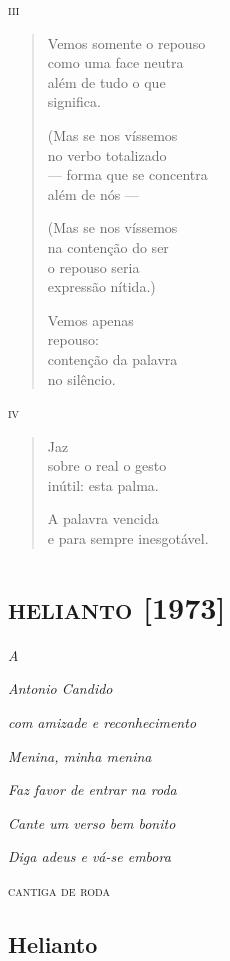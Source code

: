 \pagebreak
\textsc{iii}

\begin{verse}
Vemos somente o repouso\\
como uma face neutra\\
além de tudo o que\\
significa.

(Mas se nos víssemos\\
no verbo totalizado\\
--- forma que se concentra\\
além de nós ---

(Mas se nos víssemos\\
na contenção do ser\\
o repouso seria\\
expressão nítida.)

Vemos apenas\\
repouso:\\
contenção da palavra\\
no silêncio.
\end{verse}

\medskip
\textsc{iv}

\begin{verse}
Jaz\\
sobre o real o gesto\\
inútil: esta palma.

A palavra vencida\\
e para sempre inesgotável.
\end{verse}

\part{\textsc{helianto} {[}1973{]}}

\mbox{}
\vfill
\thispagestyle{empty}

\hfill\emph{A}

\hfill\emph{Antonio Candido}

\hfill\emph{com amizade e reconhecimento}

\pagebreak
\mbox{}\vfill
\thispagestyle{empty}

\hfill\emph{Menina, minha menina}

\hfill\emph{Faz favor de entrar na roda} 

\hfill\emph{Cante um verso bem bonito}

\hfill\emph{Diga adeus e vá-se embora}

\hfill\textsc{cantiga de roda}

\chapter{Helianto}

